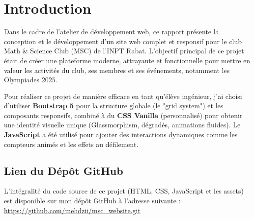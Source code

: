 \documentclass{rapportINPTCLOUD}
\begin{document}





\eleves{\Large  \textsc{}} %


\fairepagedegarde
\tabledematieres


\chapter{Introduction}
Dans le cadre de l'atelier de d\'eveloppement web, ce rapport pr\'esente la conception et le d\'eveloppement d'un site web complet et responsif pour le club Math \& Science Club (MSC) de l'INPT Rabat. L'objectif principal de ce projet \'etait de cr\'eer une plateforme moderne, attrayante et fonctionnelle pour mettre en valeur les activit\'es du club, ses membres et ses \'ev\'enements, notamment les Olympiades 2025.

Pour r\'ealiser ce projet de mani\`ere efficace en tant qu'\'el\`eve ing\'enieur, j'ai choisi d'utiliser \textbf{Bootstrap 5} pour la structure globale (le "grid system") et les composants responsifs, combin\'e \`a du \textbf{CSS Vanilla} (personnalis\'e) pour obtenir une identit\'e visuelle unique (Glassmorphism, d\'egrad\'es, animations fluides). Le \textbf{JavaScript} a \'et\'e utilis\'e pour ajouter des interactions dynamiques comme les compteurs anim\'es et les effets au d\'efilement.

\section{Lien du D\'ep\^ot GitHub}
L'int\'egralit\'e du code source de ce projet (HTML, CSS, JavaScript et les assets) est disponible sur mon d\'ep\^ot GitHub \`a l'adresse suivante :\\
\url{https://github.com/mehdzii/msc_website.git} \\
\end{document}
